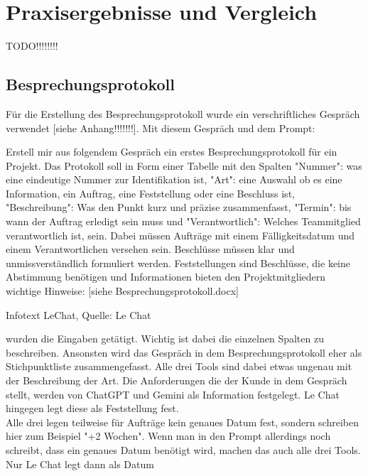 
\chapter{Praxisergebnisse und Vergleich} 

TODO!!!!!!!!

\section{Besprechungsprotokoll}  \label{CompBesprechungsprotokoll}

Für die Erstellung des Besprechungsprotokoll wurde ein verschriftliches Gespräch verwendet [siehe Anhang!!!!!!!]. Mit 
diesem Gespräch und dem Prompt:

\begin{prompt}[H]
    \begin{tcolorbox}[colback=gray!20, colframe=gray!20, boxrule=0pt, sharp corners] 
        Erstell mir aus folgendem Gespräch ein erstes Besprechungsprotokoll für ein Projekt. Das Protokoll soll in 
        Form einer Tabelle mit den Spalten "Nummer": was eine eindeutige Nummer zur Identifikation ist, "Art": eine 
        Auswahl ob es eine Information, ein Auftrag, eine Feststellung oder eine Beschluss ist, "Beschreibung": Was 
        den Punkt kurz und präzise zusammenfasst, "Termin": bis wann der Auftrag erledigt sein muss und 
        "Verantwortlich": Welches Teammitglied verantwortlich ist, sein. Dabei müssen Aufträge mit einem 
        Fälligkeitsdatum und einem Verantwortlichen versehen sein. Beschlüsse müssen klar und unmissverständlich 
        formuliert werden. Feststellungen sind Beschlüsse, die keine Abstimmung benötigen und Informationen bieten 
        den Projektmitgliedern wichtige Hinweise: [siehe Besprechungsprotokoll.docx]
        \vfill
    \end{tcolorbox}
    \caption{Infotext LeChat, Quelle: Le Chat}
    \label{InfotextLeChat}
\end{prompt}

wurden die Eingaben getätigt. Wichtig ist dabei die einzelnen Spalten zu beschreiben. Ansonsten wird das Gespräch in dem 
Besprechungsprotokoll eher als Stichpunktliste zusammengefasst. Alle drei Tools sind dabei etwas ungenau mit der 
Beschreibung der Art. Die Anforderungen die der Kunde in dem Gespräch stellt, werden von ChatGPT und Gemini als 
Information festgelegt. Le Chat hingegen legt diese als Feststellung fest.\\
Alle drei legen teilweise für Aufträge kein genaues Datum fest, sondern schreiben hier zum Beispiel "+2 Wochen". Wenn 
man in den Prompt allerdings noch schreibt, dass ein genaues Datum benötigt wird, machen das auch alle drei Tools. Nur 
Le Chat legt dann als Datum

